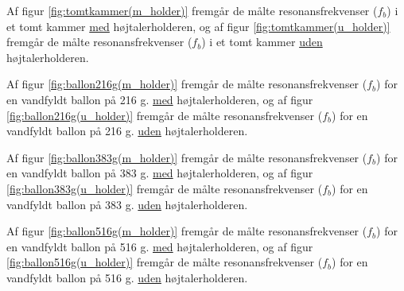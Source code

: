 {Af figur \ref{fig:tomtkammer(m_holder)} fremgår de målte resonansfrekvenser ($f_{b}$) i et tomt kammer \underline{med} højtalerholderen, og af figur \ref{fig:tomtkammer(u_holder)} fremgår de målte resonansfrekvenser ($f_{b}$) i et tomt kammer \underline{uden} højtalerholderen. 

Af figur \ref{fig:ballon216g(m_holder)} fremgår de målte resonansfrekvenser ($f_{b}$) for en vandfyldt ballon på 216 g. \underline{med} højtalerholderen, og af figur \ref{fig:ballon216g(u_holder)} fremgår de målte resonansfrekvenser ($f_{b}$) for en vandfyldt ballon på 216 g. \underline{uden} højtalerholderen.  

Af figur \ref{fig:ballon383g(m_holder)} fremgår de målte resonansfrekvenser ($f_{b}$) for en vandfyldt ballon på 383 g. \underline{med} højtalerholderen, og af figur \ref{fig:ballon383g(u_holder)} fremgår de målte resonansfrekvenser ($f_{b}$) for en vandfyldt ballon på 383 g. \underline{uden} højtalerholderen.  

Af figur \ref{fig:ballon516g(m_holder)} fremgår de målte resonansfrekvenser ($f_{b}$) for en vandfyldt ballon på 516 g. \underline{med} højtalerholderen, og af figur \ref{fig:ballon516g(u_holder)} fremgår de målte resonansfrekvenser ($f_{b}$) for en vandfyldt ballon på 516 g. \underline{uden} højtalerholderen.  

}
